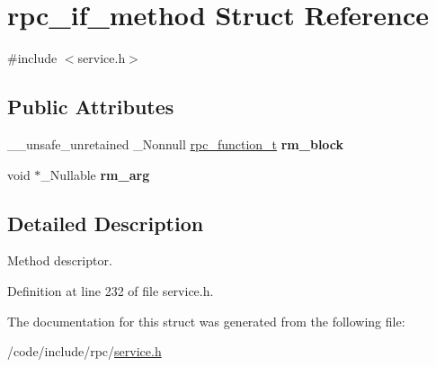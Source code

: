 \hypertarget{structrpc__if__method}{}\section{rpc\+\_\+if\+\_\+method Struct Reference}
\label{structrpc__if__method}


{\ttfamily \#include $<$service.\+h$>$}

\subsection*{Public Attributes}
\begin{DoxyCompactItemize}
\item 
\mbox{\label{structrpc__if__method_a479530c031d4da4fb1a3c6a38de19106}} 
\+\_\+\+\_\+unsafe\+\_\+unretained \+\_\+\+Nonnull \hyperlink{service_8h_ae49a22468cfcd4adfa558078e9e4e312}{rpc\+\_\+function\+\_\+t} {\bfseries rm\+\_\+block}
\item 
\mbox{\label{structrpc__if__method_a85a2f339a726ef4afb885cbf157c0998}} 
void $\ast$\+\_\+\+Nullable {\bfseries rm\+\_\+arg}
\end{DoxyCompactItemize}


\subsection{Detailed Description}
Method descriptor. 

Definition at line 232 of file service.\+h.



The documentation for this struct was generated from the following file\+:\begin{DoxyCompactItemize}
\item 
/code/include/rpc/\hyperlink{service_8h}{service.\+h}\end{DoxyCompactItemize}
